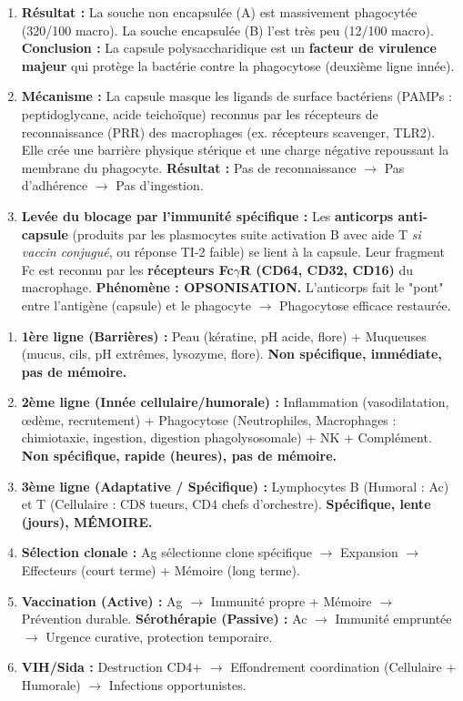 \documentclass[11pt]{article}
\begin{document}
\begin{corrige}
\begin{enumerate}
    \item \textbf{Résultat :} La souche non encapsulée (A) est massivement phagocytée (320/100 macro). La souche encapsulée (B) l'est très peu (12/100 macro). \textbf{Conclusion :} La capsule polysaccharidique est un \textbf{facteur de virulence majeur} qui protège la bactérie contre la phagocytose (deuxième ligne innée).
    \item \textbf{Mécanisme :} La capsule masque les ligands de surface bactériens (PAMPs : peptidoglycane, acide teichoïque) reconnus par les récepteurs de reconnaissance (PRR) des macrophages (ex. récepteurs scavenger, TLR2). Elle crée une barrière physique stérique et une charge négative repoussant la membrane du phagocyte. \textbf{Résultat :} Pas de reconnaissance $\to$ Pas d'adhérence $\to$ Pas d'ingestion.
    \item \textbf{Levée du blocage par l'immunité spécifique :} Les \textbf{anticorps anti-capsule} (produits par les plasmocytes suite activation B avec aide T \emph{si vaccin conjugué}, ou réponse TI-2 faible) se lient à la capsule. Leur fragment Fc est reconnu par les \textbf{récepteurs Fc$\gamma$R (CD64, CD32, CD16)} du macrophage. \textbf{Phénomène : OPSONISATION.} L'anticorps fait le "pont" entre l'antigène (capsule) et le phagocyte $\to$ Phagocytose efficace restaurée.
\end{enumerate}
\end{corrige}

\begin{aretenir}
\begin{enumerate}
    \item \textbf{1ère ligne (Barrières) :} Peau (kératine, pH acide, flore) + Muqueuses (mucus, cils, pH extrêmes, lysozyme, flore). \textbf{Non spécifique, immédiate, pas de mémoire.}
    \item \textbf{2ème ligne (Innée cellulaire/humorale) :} Inflammation (vasodilatation, œdème, recrutement) + Phagocytose (Neutrophiles, Macrophages : chimiotaxie, ingestion, digestion phagolysosomale) + NK + Complément. \textbf{Non spécifique, rapide (heures), pas de mémoire.}
    \item \textbf{3ème ligne (Adaptative / Spécifique) :} Lymphocytes B (Humoral : Ac) et T (Cellulaire : CD8 tueurs, CD4 chefs d'orchestre). \textbf{Spécifique, lente (jours), MÉMOIRE.}
    \item \textbf{Sélection clonale :} Ag sélectionne clone spécifique $\to$ Expansion $\to$ Effecteurs (court terme) + Mémoire (long terme).
    \item \textbf{Vaccination (Active) :} Ag $\to$ Immunité propre + Mémoire $\to$ Prévention durable. \textbf{Sérothérapie (Passive) :} Ac $\to$ Immunité empruntée $\to$ Urgence curative, protection temporaire.
    \item \textbf{VIH/Sida :} Destruction CD4+ $\to$ Effondrement coordination (Cellulaire + Humorale) $\to$ Infections opportunistes.
\end{enumerate}
\end{aretenir}
\end{document}
